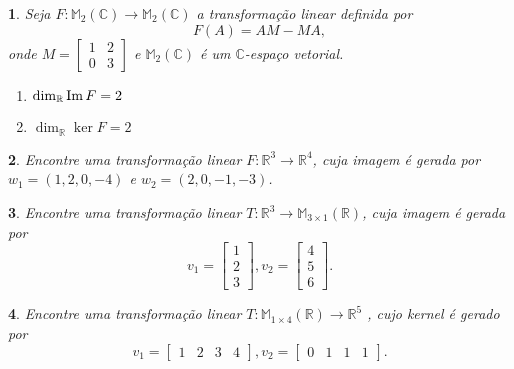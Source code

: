 \documentclass[12pt]{exam}
\newtheorem{exercicio}{}
\newcommand{\im}{{\rm Im\,}}
\newcommand{\real}{\mathbb{R}}
\newcommand{\complex}{\mathbb{C}}
\newcommand{\cp}[1]{\mathbb{#1}}
\begin{document}
\begin{exercicio}\label{nucleo_imagem_fim}
  Seja $F : \cp{M}_2(\complex) \to \cp{M}_2(\complex)$ a transforma\c{c}\~ao linear definida por
  \[
    F(A) = AM - MA,
  \]
  onde $M = \begin{bmatrix}
    1 & 2\\0 & 3
  \end{bmatrix}$ e $\cp{M}_2(\complex)$ \'e um $\complex$-espa\c{c}o vetorial.
  \begin{solucao}
    \begin{enumerate}[label=({\alph*})]
      \item $\dim_\real\im F = 2$
      \item $\dim_\real\ker F = 2$
    \end{enumerate}
  \end{solucao}
\end{exercicio}

\begin{exercicio}
  Encontre uma transforma\c{c}\~ao linear $F : \real^3 \to \real^4$, cuja imagem \'e gerada por $w_1 = (1,2,0,-4)$ e $w_2 = (2,0,-1,-3)$.
\end{exercicio}

\begin{exercicio}
  Encontre uma transforma\c{c}\~ao linear $T : \real^3 \to \cp{M}_{3 \times 1}(\real)$, cuja imagem \'e gerada por
  \[
    v_1 = \begin{bmatrix}
      1\\2\\3
    \end{bmatrix}, v_2 = \begin{bmatrix}
      4\\5\\6
    \end{bmatrix}.
  \]
\end{exercicio}

\begin{exercicio}
  Encontre uma transforma\c{c}\~ao linear $T : \cp{M}_{1 \times 4}(\real) \to \real^5$ , cujo kernel \'e gerado por
  \[
    v_1 = \begin{bmatrix}
      1 & 2 & 3 & 4
    \end{bmatrix}, v_2 = \begin{bmatrix}
      0 & 1 & 1 & 1
    \end{bmatrix}.
  \]
\end{exercicio}
\end{document}
